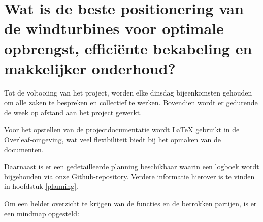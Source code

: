 \section{Wat is de beste positionering van de windturbines voor optimale opbrengst, efficiënte bekabeling en makkelijker onderhoud?}
Tot de voltooiing van het project, worden elke dinsdag bijeenkomsten gehouden om alle zaken te bespreken en collectief te werken. Bovendien wordt er gedurende de week op afstand aan het project gewerkt.

Voor het opstellen van de projectdocumentatie wordt LaTeX gebruikt in de Overleaf-omgeving, wat veel flexibiliteit biedt bij het opmaken van de documenten.

Daarnaast is er een gedetailleerde planning beschikbaar waarin een logboek wordt bijgehouden via onze Github-repository. Verdere informatie hierover is te vinden in hoofdstuk \ref{planning}.

Om een helder overzicht te krijgen van de functies en de betrokken partijen, is er een mindmap opgesteld:%



\vspace{1cm} 
\begin{minipage}[t][][b]{\linewidth}
  
\end{minipage}